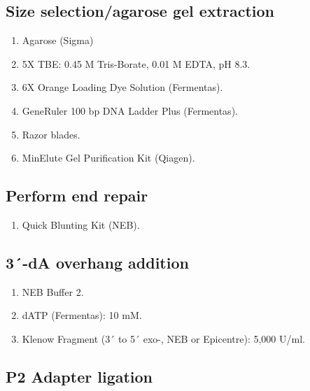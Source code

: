\documentclass[
  letterpaper,
  DIV=11,
  numbers=noendperiod]{scrreprt}
\providecommand{\tightlist}{%
  \setlength{\itemsep}{0pt}\setlength{\parskip}{0pt}}\usepackage{longtable,booktabs,array}
\begin{document}
\hypertarget{size-selectionagarose-gel-extraction}{%
\subsection{Size selection/agarose gel
extraction}\label{size-selectionagarose-gel-extraction}}

\begin{enumerate}
\def\labelenumi{\arabic{enumi}.}
\tightlist
\item
  Agarose (Sigma)
\item
  5X TBE: 0.45 M Tris-Borate, 0.01 M EDTA, pH 8.3.
\item
  6X Orange Loading Dye Solution (Fermentas).
\item
  GeneRuler 100 bp DNA Ladder Plus (Fermentas).
\item
  Razor blades.
\item
  MinElute Gel Purification Kit (Qiagen).
\end{enumerate}

\hypertarget{perform-end-repair}{%
\subsection{Perform end repair}\label{perform-end-repair}}

\begin{enumerate}
\def\labelenumi{\arabic{enumi}.}
\tightlist
\item
  Quick Blunting Kit (NEB).
\end{enumerate}

\hypertarget{da-overhang-addition}{%
\subsection{3´-dA overhang addition}\label{da-overhang-addition}}

\begin{enumerate}
\def\labelenumi{\arabic{enumi}.}
\tightlist
\item
  NEB Buffer 2.
\item
  dATP (Fermentas): 10 mM.
\item
  Klenow Fragment (3´ to 5´ exo-, NEB or Epicentre): 5,000 U/ml.
\end{enumerate}

\hypertarget{p2-adapter-ligation}{%
\subsection{P2 Adapter ligation}\label{p2-adapter-ligation}}
\end{document}
